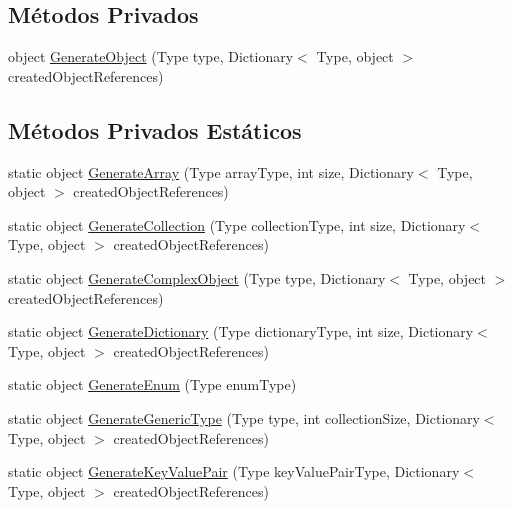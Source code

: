 \subsection*{Métodos Privados}
\begin{DoxyCompactItemize}
\item 
object \hyperlink{classApi3Layers_1_1Areas_1_1HelpPage_1_1ObjectGenerator_a8eeb38d007adae0b9b5a217de0da094d}{Generate\+Object} (Type type, Dictionary$<$ Type, object $>$ created\+Object\+References)
\end{DoxyCompactItemize}
\subsection*{Métodos Privados Estáticos}
\begin{DoxyCompactItemize}
\item 
static object \hyperlink{classApi3Layers_1_1Areas_1_1HelpPage_1_1ObjectGenerator_ae308e6232f8912fc509c4e12501bdf87}{Generate\+Array} (Type array\+Type, int size, Dictionary$<$ Type, object $>$ created\+Object\+References)
\item 
static object \hyperlink{classApi3Layers_1_1Areas_1_1HelpPage_1_1ObjectGenerator_adc56bccebb641bb203bf37cc2ea7bcc1}{Generate\+Collection} (Type collection\+Type, int size, Dictionary$<$ Type, object $>$ created\+Object\+References)
\item 
static object \hyperlink{classApi3Layers_1_1Areas_1_1HelpPage_1_1ObjectGenerator_a8fc9bddba4980a0e5042c92ac6013334}{Generate\+Complex\+Object} (Type type, Dictionary$<$ Type, object $>$ created\+Object\+References)
\item 
static object \hyperlink{classApi3Layers_1_1Areas_1_1HelpPage_1_1ObjectGenerator_a7d56ab32a5d1fe08154e1800fee66b22}{Generate\+Dictionary} (Type dictionary\+Type, int size, Dictionary$<$ Type, object $>$ created\+Object\+References)
\item 
static object \hyperlink{classApi3Layers_1_1Areas_1_1HelpPage_1_1ObjectGenerator_a1d8ea92abcba85302bc5575e056f3133}{Generate\+Enum} (Type enum\+Type)
\item 
static object \hyperlink{classApi3Layers_1_1Areas_1_1HelpPage_1_1ObjectGenerator_a52bbcd61c7e14a2b935bea92cd8c3dea}{Generate\+Generic\+Type} (Type type, int collection\+Size, Dictionary$<$ Type, object $>$ created\+Object\+References)
\item 
static object \hyperlink{classApi3Layers_1_1Areas_1_1HelpPage_1_1ObjectGenerator_a8f3d117002fab2265c2c6ec6262d5107}{Generate\+Key\+Value\+Pair} (Type key\+Value\+Pair\+Type, Dictionary$<$ Type, object $>$ created\+Object\+References)

\end{DoxyCompactItemize}

